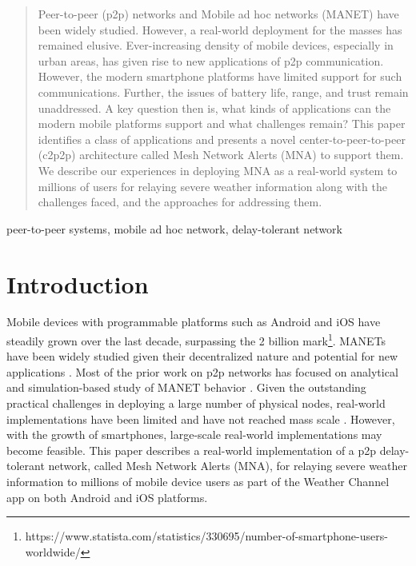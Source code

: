 \documentclass[conference]{IEEEtran}
\begin{document}
\begin{abstract}
Peer-to-peer (p2p) networks and Mobile ad hoc networks (MANET) have
been widely studied. However, a real-world deployment for the masses
has remained elusive. Ever-increasing density of mobile devices,
especially in urban areas, has given rise to new applications of p2p
communication. However, the modern smartphone platforms have limited
support for such communications. Further, the issues of battery life,
range, and trust remain unaddressed. A key question then is, what
kinds of applications can the modern mobile platforms support and what
challenges remain? This paper identifies a class of applications and
presents a novel center-to-peer-to-peer (c2p2p) architecture called
Mesh Network Alerts (MNA) to support them.  We describe our
experiences in deploying MNA as a real-world system to millions of
users for relaying severe weather information along with the
challenges faced, and the approaches for addressing them.
\end{abstract}

\begin{IEEEkeywords}
peer-to-peer systems, mobile ad hoc network, delay-tolerant network
\end{IEEEkeywords}

\section{Introduction}
Mobile devices with programmable platforms such as Android and iOS
have steadily grown over the last decade, surpassing the 2 billion
mark\footnote{https://www.statista.com/statistics/330695/number-of-smartphone-users-worldwide/}. MANETs
have been widely studied given their decentralized nature and
potential for new applications
\cite{loo-manet-2011,perkins-ad-hoc-2001}. Most of the prior work on
p2p networks has focused on analytical and simulation-based study of
MANET behavior
\cite{zhang-topology-manet-2015,marti-misbehavior-manet-2000,mauve-pos-routing-manet-2001}. Given
the outstanding practical challenges in deploying a large number of
physical nodes, real-world implementations have been limited and have
not reached mass scale \cite{kiess-manet-impl-2007}. However, with the
growth of smartphones, large-scale real-world implementations may
become feasible. This paper describes a real-world implementation of a
p2p delay-tolerant network, called Mesh Network Alerts (MNA), for
relaying severe weather information to millions of mobile device users
as part of the Weather Channel app \cite{mna} on both Android and iOS
platforms.
\end{document}
